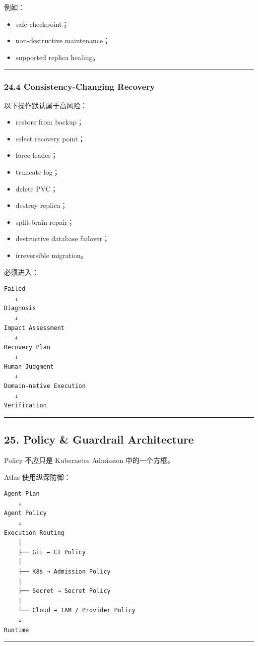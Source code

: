 \documentclass[11pt,a4paper]{article}
\begin{document}
例如：

\begin{itemize}
  \item safe checkpoint；
  \item non-destructive maintenance；
  \item supported replica healing。
\end{itemize}
\vspace{0.5em}\hrule\vspace{0.5em}
\subsubsection{24.4 Consistency-Changing Recovery}
以下操作默认属于高风险：

\begin{itemize}
  \item restore from backup；
  \item select recovery point；
  \item force leader；
  \item truncate log；
  \item delete PVC；
  \item destroy replica；
  \item split-brain repair；
  \item destructive database failover；
  \item irreversible migration。
\end{itemize}
必须进入：

\begin{lstlisting}[language=text]
Failed
   ↓
Diagnosis
   ↓
Impact Assessment
   ↓
Recovery Plan
   ↓
Human Judgment
   ↓
Domain-native Execution
   ↓
Verification
\end{lstlisting}
\vspace{0.5em}\hrule\vspace{0.5em}
\subsection{25. Policy \& Guardrail Architecture}
Policy 不应只是 Kubernetes Admission 中的一个方框。

Atlas 使用纵深防御：

\begin{lstlisting}[language=text]
Agent Plan
    ↓
Agent Policy
    ↓
Execution Routing
    │
    ├── Git → CI Policy
    │
    ├── K8s → Admission Policy
    │
    ├── Secret → Secret Policy
    │
    └── Cloud → IAM / Provider Policy
    ↓
Runtime
\end{lstlisting}
\vspace{0.5em}\hrule\vspace{0.5em}
\end{document}
